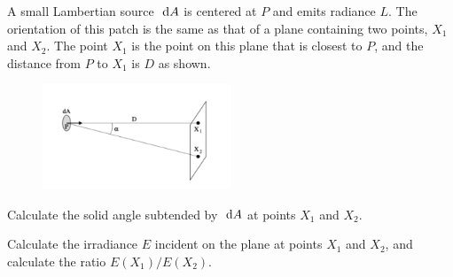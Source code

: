 \begin{problem}
  A small Lambertian source $\text{ d} A$ is centered at $P$
  and emits radiance $L$. The orientation of this patch is the same
  as that of a plane containing two points, $X_1$ and $X_2$.
  The point $X_1$ is the point on this plane that is closest to $P$,
  and the distance from $P$ to $X_1$ is $D$ as shown.
  \begin{figure}[H]
    \centering
    \includegraphics[width=0.5\textwidth]{figures/lambertian.png}
    \label{fig:1}
  \end{figure}
  \begin{enumroman}
    \item Calculate the solid angle subtended by $\text{ d} A$ at points $X_1$ and $X_2$.
      \begin{answer}
        
      \end{answer}
    \item Calculate the irradiance $E$ incident on the plane at points $X_1$ and $X_2$,
      and calculate the ratio $E(X_1)/E(X_2)$.
      \begin{answer}
        
      \end{answer}
  \end{enumroman}
\end{problem}

